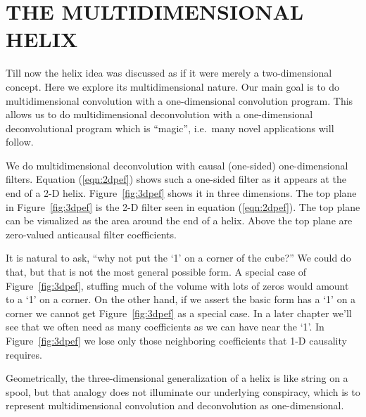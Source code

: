 \begin{comment}
\par
An operator for applying the helix filter is
\texttt{helderiv} \vpageref{lst:helderiv}.
\opdex{helderiv}{helix-derivative filter}
\end{comment}

\section{THE MULTIDIMENSIONAL HELIX}
Till now
the helix idea was discussed
as if it were merely a two-dimensional concept.
Here we explore its multidimensional nature.
Our main goal is to do multidimensional convolution
with a one-dimensional convolution program.
This allows us to do multidimensional deconvolution
with a one-dimensional deconvolutional program
which is ``magic'',
i.e.~many novel applications will follow.


\par
We do multidimensional deconvolution with causal (one-sided)
one-dimensional filters.
Equation (\ref{eqn:2dpef}) shows such a one-sided filter as
it appears at the end of a 2-D helix.
Figure~\ref{fig:3dpef} shows it in three dimensions.
The top plane in Figure~\ref{fig:3dpef} 
is the 2-D filter seen in equation (\ref{eqn:2dpef}).
The top plane can be visualized as the area around the end of a helix.
Above the top plane are zero-valued anticausal filter coefficients.

\par
It is natural to ask,
``why not put the `1' on a corner of the cube?''
We could do that, but that is not the most general possible form.
A special case of Figure~\ref{fig:3dpef},
stuffing much of the volume with lots of zeros
would amount to a `1' on a corner.
On the other hand, if we assert the basic form has a `1' on a corner
we cannot get Figure~\ref{fig:3dpef} as a special case.
In a later chapter we'll see that we often need as many coefficients
as we can have near the `1'.
In Figure~\ref{fig:3dpef} we lose only those neighboring coefficients
that 1-D causality requires.



\par
Geometrically, the three-dimensional generalization of a helix
is like string on a spool,
but that analogy does not illuminate our underlying conspiracy,
which is to represent multidimensional convolution and deconvolution
as one-dimensional.


